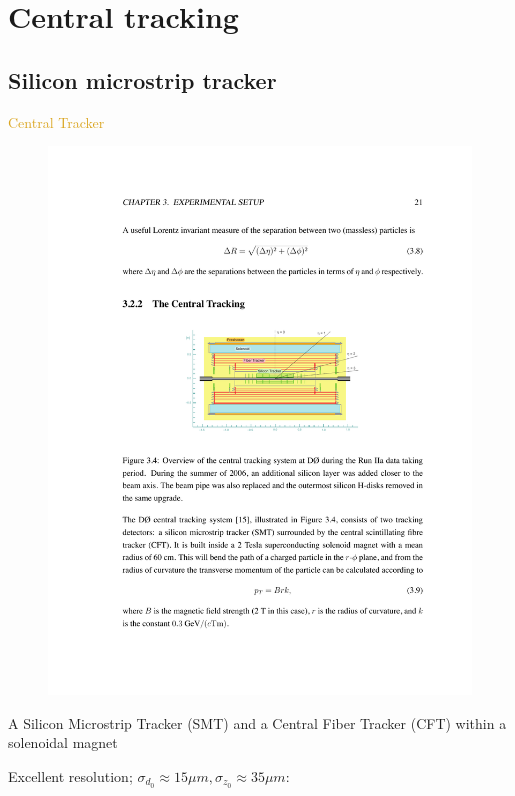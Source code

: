

\section{Central tracking}

\subsection{Silicon microstrip tracker}
\begin{frame}{\textcolor{Goldenrod}{Central Tracker}}
  \begin{overlayarea}{\textwidth}{\textheight}
    \begin{figure}[h]
      \centering
      \includegraphics[height=0.4\textheight]{./Images/08_CT.pdf}
    \end{figure}
    
    \itt
  \item
    A Silicon Microstrip Tracker (SMT) and a Central Fiber Tracker
    (CFT) within a solenoidal magnet
  \item Excellent resolution; $\sigma_{d_0} \approx 15 \mu m, 
    \sigma_{z_0}\approx 35\mu m$:\\
    \tti
  \end{overlayarea}
\end{frame}


